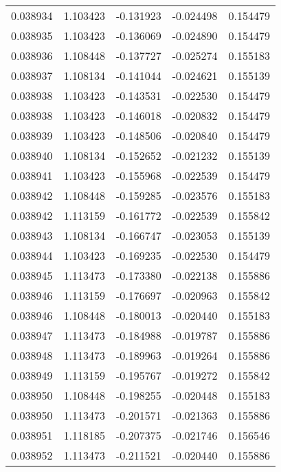 \begin{tabular}{lrrrr}
0.038934    &  1.103423 & -0.131923 & -0.024498 &             0.154479 \\
0.038935    &  1.103423 & -0.136069 & -0.024890 &             0.154479 \\
0.038936    &  1.108448 & -0.137727 & -0.025274 &             0.155183 \\
0.038937    &  1.108134 & -0.141044 & -0.024621 &             0.155139 \\
0.038938    &  1.103423 & -0.143531 & -0.022530 &             0.154479 \\
0.038938    &  1.103423 & -0.146018 & -0.020832 &             0.154479 \\
0.038939    &  1.103423 & -0.148506 & -0.020840 &             0.154479 \\
0.038940    &  1.108134 & -0.152652 & -0.021232 &             0.155139 \\
0.038941    &  1.103423 & -0.155968 & -0.022539 &             0.154479 \\
0.038942    &  1.108448 & -0.159285 & -0.023576 &             0.155183 \\
0.038942    &  1.113159 & -0.161772 & -0.022539 &             0.155842 \\
0.038943    &  1.108134 & -0.166747 & -0.023053 &             0.155139 \\
0.038944    &  1.103423 & -0.169235 & -0.022530 &             0.154479 \\
0.038945    &  1.113473 & -0.173380 & -0.022138 &             0.155886 \\
0.038946    &  1.113159 & -0.176697 & -0.020963 &             0.155842 \\
0.038946    &  1.108448 & -0.180013 & -0.020440 &             0.155183 \\
0.038947    &  1.113473 & -0.184988 & -0.019787 &             0.155886 \\
0.038948    &  1.113473 & -0.189963 & -0.019264 &             0.155886 \\
0.038949    &  1.113159 & -0.195767 & -0.019272 &             0.155842 \\
0.038950    &  1.108448 & -0.198255 & -0.020448 &             0.155183 \\
0.038950    &  1.113473 & -0.201571 & -0.021363 &             0.155886 \\
0.038951    &  1.118185 & -0.207375 & -0.021746 &             0.156546 \\
0.038952    &  1.113473 & -0.211521 & -0.020440 &             0.155886 \\

\end{tabular}
